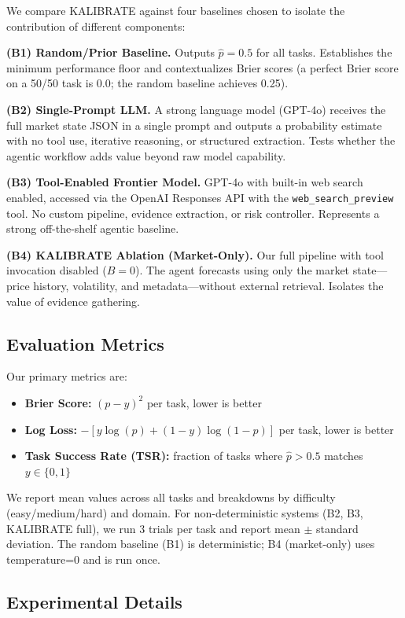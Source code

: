 \documentclass{article} %
\newcommand{\agentname}{KALIBRATE}
\begin{document}
We compare \agentname{} against four baselines chosen to isolate the contribution of different components:

\textbf{(B1) Random/Prior Baseline.} Outputs $\hat{p} = 0.5$ for all tasks. Establishes the minimum performance floor and contextualizes Brier scores (a perfect Brier score on a 50/50 task is 0.0; the random baseline achieves 0.25).

\textbf{(B2) Single-Prompt LLM.} A strong language model (GPT-4o) receives the full market state JSON in a single prompt and outputs a probability estimate with no tool use, iterative reasoning, or structured extraction. Tests whether the agentic workflow adds value beyond raw model capability.

\textbf{(B3) Tool-Enabled Frontier Model.} GPT-4o with built-in web search enabled, accessed via the OpenAI Responses API with the \texttt{web\_search\_preview} tool. No custom pipeline, evidence extraction, or risk controller. Represents a strong off-the-shelf agentic baseline.

\textbf{(B4) \agentname{} Ablation (Market-Only).} Our full pipeline with tool invocation disabled ($B = 0$). The agent forecasts using only the market state—price history, volatility, and metadata—without external retrieval. Isolates the value of evidence gathering.

\subsection{Evaluation Metrics}

Our primary metrics are:
\begin{itemize}[noitemsep]
    \item \textbf{Brier Score:} $(p - y)^2$ per task, lower is better
    \item \textbf{Log Loss:} $-[y \log(p) + (1-y)\log(1-p)]$ per task, lower is better
    \item \textbf{Task Success Rate (TSR):} fraction of tasks where $\hat{p} > 0.5$ matches $y \in \{0,1\}$
\end{itemize}

We report mean values across all tasks and breakdowns by difficulty (easy/medium/hard) and domain. For non-deterministic systems (B2, B3, \agentname{} full), we run 3 trials per task and report mean $\pm$ standard deviation. The random baseline (B1) is deterministic; B4 (market-only) uses temperature=0 and is run once.

\subsection{Experimental Details}
\end{document}
